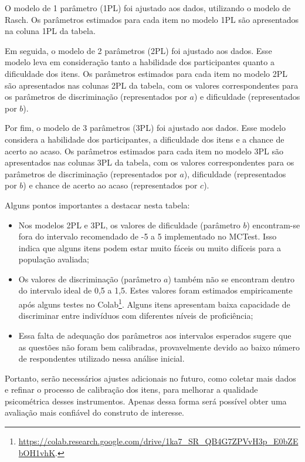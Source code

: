 O modelo de 1 parâmetro (1PL) foi ajustado aos dados, utilizando o modelo de Rasch. Os parâmetros estimados para cada item no modelo 1PL são apresentados na coluna 1PL da tabela.

Em seguida, o modelo de 2 parâmetros (2PL) foi ajustado aos dados. Esse modelo leva em consideração tanto a habilidade dos participantes quanto a dificuldade dos itens. Os parâmetros estimados para cada item no modelo 2PL são apresentados nas colunas 2PL da tabela, com os valores correspondentes para os parâmetros de discriminação (representados por $a$) e dificuldade (representados por $b$).

Por fim, o modelo de 3 parâmetros (3PL) foi ajustado aos dados. Esse modelo considera a habilidade dos participantes, a dificuldade dos itens e a chance de acerto ao acaso. Os parâmetros estimados para cada item no modelo 3PL são apresentados nas colunas 3PL da tabela, com os valores correspondentes para os parâmetros de discriminação (representados por $a$), dificuldade (representados por $b$) e chance de acerto ao acaso (representados por $c$).

Alguns pontos importantes a destacar nesta tabela:
\begin{itemize}
    \item Nos modelos 2PL e 3PL, os valores de dificuldade (parâmetro $b$) encontram-se fora do intervalo recomendado de -5 a 5 implementado no MCTest. Isso indica que alguns itens podem estar muito fáceis ou muito difíceis para a população avaliada;
    \item Os valores de discriminação (parâmetro $a$) também não se encontram dentro do intervalo ideal de 0,5 a 1,5. Estes valores foram estimados empiricamente após alguns testes no Colab\footnote{\url{https://colab.research.google.com/drive/1ka7_SR_QB4G7ZPVvH3p_E0bZEbOH1vhK}.}. Alguns itens apresentam baixa capacidade de discriminar entre indivíduos com diferentes níveis de proficiência;
    \item Essa falta de adequação dos parâmetros aos intervalos esperados sugere que as questões não foram bem calibradas, provavelmente devido ao baixo número de respondentes utilizado nessa análise inicial.
\end{itemize}
Portanto, serão necessários ajustes adicionais no futuro, como coletar mais dados e refinar o processo de calibração dos itens, para melhorar a qualidade psicométrica desses instrumentos. Apenas dessa forma será possível obter uma avaliação mais confiável do construto de interesse.

